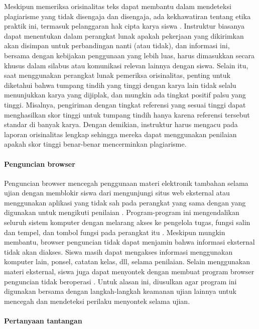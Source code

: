 Meskipun memeriksa orisinalitas teks dapat membantu dalam mendeteksi plagiarisme yang tidak disengaja dan disengaja, ada kekhawatiran tentang etika praktik ini, termasuk pelanggaran hak cipta karya siswa \citep{horovitz2008two}. Instruktur biasanya dapat menentukan dalam perangkat lunak apakah pekerjaan yang dikirimkan akan disimpan untuk perbandingan nanti (atau tidak), dan informasi ini, bersama dengan kebijakan penggunaan yang lebih luas, harus dimasukkan secara khusus dalam silabus atau komunikasi relevan lainnya dengan siswa. Selain itu, saat menggunakan perangkat lunak pemeriksa orisinalitas, penting untuk diketahui bahwa tumpang tindih yang tinggi dengan karya lain tidak selalu menunjukkan karya yang dijiplak, dan mungkin ada tingkat positif palsu yang tinggi. Misalnya, pengiriman dengan tingkat referensi yang sesuai tinggi dapat menghasilkan skor tinggi untuk tumpang tindih hanya karena referensi tersebut standar di banyak karya. Dengan demikian, instruktur harus mengacu pada laporan orisinalitas lengkap sehingga mereka dapat menggunakan penilaian apakah skor tinggi benar-benar mencerminkan plagiarisme.

\paragraph{Penguncian browser}
\label{par:penguncianbrowser}

Penguncian browser mencegah penggunaan materi elektronik tambahan selama ujian dengan memblokir siswa dari mengunjungi situs web eksternal atau menggunakan aplikasi yang tidak sah pada perangkat yang sama dengan yang digunakan untuk mengikuti penilaian \citep{cote2016video}. Program-program ini mengendalikan seluruh sistem komputer dengan melarang akses ke pengelola tugas, fungsi salin dan tempel, dan tombol fungsi pada perangkat itu \citep{percival2008virtual}. Meskipun mungkin membantu, browser penguncian tidak dapat menjamin bahwa informasi eksternal tidak akan diakses. Siswa masih dapat mengakses informasi menggunakan komputer lain, ponsel, catatan kelas, dll, selama penilaian. Selain menggunakan materi eksternal, siswa juga dapat menyontek dengan membuat program browser penguncian tidak beroperasi \citep{percival2008virtual}. Untuk alasan ini, diusulkan agar program ini digunakan bersama dengan langkah-langkah keamanan ujian lainnya untuk mencegah dan mendeteksi perilaku menyontek selama ujian.

\paragraph{Pertanyaan tantangan}
\label{par:pertanyaantantangan}

